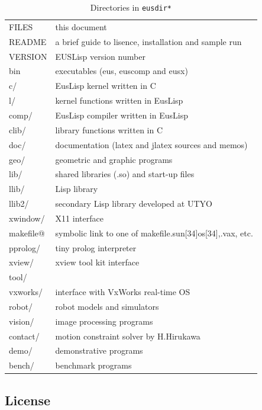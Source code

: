 \begin{table}
\begin{center}
{\footnotesize
\begin{tabular}{|l | l|}\hline 
FILES &  this document \\
README &  a brief guide to lisence, installation and sample run\\
VERSION &  EUSLisp version number\\
bin &  executables (eus, euscomp and eusx) \\
c/ &  EusLisp kernel written in C\\
l/ &  kernel functions written in EusLisp\\
comp/ &  EusLisp compiler written in EusLisp\\
clib/ &  library functions written in C\\
doc/ &  documentation (latex and jlatex sources and memos)\\
geo/ &  geometric and graphic programs\\
lib/ & shared libraries (.so) and start-up files\\
llib/ &  Lisp library \\
llib2/ &  secondary Lisp library developed at UTYO\\
xwindow/ &  X11 interface\\
makefile@ &  symbolic link to one of makefile.sun[34]os[34],.vax, etc.\\
pprolog/ &  tiny prolog interpreter\\
xview/ &  xview tool kit interface\\
tool/ & \\
vxworks/ & interface with VxWorks real-time OS\\
robot/ & robot models and simulators\\
vision/ &  image processing programs\\
contact/ & motion constraint solver by H.Hirukawa
\cite{Hirukawa:1991a,Hirukawa:1991b,Hirukawa:1991c}\\
demo/ &  demonstrative programs\\
bench/ &  benchmark programs\\ \hline
\end{tabular}
}
\end{center}
\caption{\label{Directories}Directories in {\tt *eusdir*}}
\end{table}

\subsection{\label{License}License}

